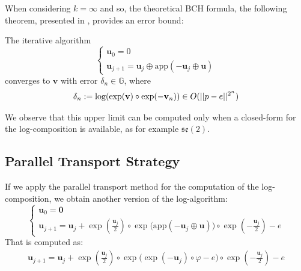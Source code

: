 When considering $k = \infty$ and so, the theoretical BCH formula, the following theorem, presented in \cite{Bossa:08}, provides an error bound:
\begin{theorem}[Bossa]\label{th:bossa}
	The iterative algorithm 
	\begin{equation}
	\begin{cases}
	\mathbf{u}_0 = 0 \\
	\mathbf{u}_{j+1} %
	                          = \mathbf{u}_{j} \oplus  \text{app}(-\mathbf{u}_{j}  \oplus  \mathbf{u} )
	\end{cases}
	\end{equation}
	converges to $\mathbf{v}$ with error $\delta_n \in \mathbb{G}$, where
	\begin{align*}
	\delta_{n} := \log(\exp(\mathbf{v})\circ \exp(-\mathbf{v}_{n})) \in O(\vert\lvert p - e \rvert\vert^{2^{n}})
	\end{align*}
\end{theorem}

We observe that this upper limit can be computed only when a closed-form for the log-composition is available, as for example $\mathfrak{se}(2)$.

\subsection{Parallel Transport Strategy}

If we apply the parallel transport method for the computation of the log-composition, we obtain another version of the log-algorithm:
\begin{equation}\label{eq:bossa_parallel_strategy}
\begin{cases}
\mathbf{u}_0 = \mathbf{0} \\
\mathbf{u}_{j+1} 
= 
\mathbf{u}_{j} 
+ 
\exp(\frac{\mathbf{u}_{j}}{2}) \circ \exp\Big(   \text{app}(-\mathbf{u}_{j}  \oplus  \mathbf{u} ) \Big)
\circ 
\exp(-\frac{\mathbf{u}_{j}}{2}) - e
\end{cases}
\end{equation}
That is computed as:
\begin{align*}
\mathbf{u}_{j+1} 
= 
\mathbf{u}_{j} 
+ 
\exp(\frac{\mathbf{u}_{j}}{2}) \circ \exp\Big(   \exp(-\mathbf{u}_{j}) \circ\varphi  - e \Big)
\circ 
\exp(-\frac{\mathbf{u}_{j}}{2}) - e
\end{align*}

